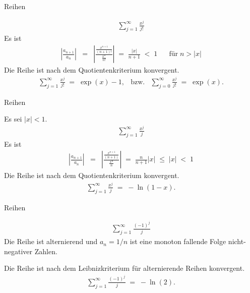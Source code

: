 \documentclass[german]{beamer}
\newcommand{\bq}{\begin{eqnarray*}}
\newcommand{\eq}{\end{eqnarray*}}
\begin{document}
\begin{frame}{Reihen}

\begin{example}
\bq
 \sum\limits_{j=1}^\infty \frac{x^j}{j!}
\eq
Es ist
\bq
 \left| \frac{a_{n+1}}{a_n} \right|
 & = & 
 \left| \frac{\frac{x^{n+1}}{(n+1)!}}{\frac{x^n}{n!}} \right|
 \; = \;
 \frac{\left|x\right|}{n+1} 
 \; < \; 1
 \;\;\;\;\;\; \mbox{f\"ur} \; n > |x|
\eq
Die Reihe ist nach dem Quotientenkriterium konvergent.
\bq
 \sum\limits_{j=1}^\infty \frac{x^j}{j!}
 \; = \; \exp\left(x\right) - 1,
 & \mbox{bzw.} &
 \sum\limits_{j=0}^\infty \frac{x^j}{j!}
 \; = \;\exp\left(x\right).
\eq

\end{example}

\end{frame}

\begin{frame}{Reihen}

\begin{example}
Es sei $|x|<1$.
\bq
 \sum\limits_{j=1}^\infty \frac{x^j}{j}
\eq
Es ist
\bq
 \left| \frac{a_{n+1}}{a_n} \right|
 & = & 
 \left| \frac{\frac{x^{n+1}}{(n+1)}}{\frac{x^n}{n}} \right|
 \; = \;
 \frac{n}{n+1} \left|x\right|
 \; \le \;  \left|x\right|
 \; < \; 1
\eq
Die Reihe ist nach dem Quotientenkriterium konvergent.
\bq
 \sum\limits_{j=1}^\infty \frac{x^j}{j}
 \; = \; -\ln\left(1-x\right).
\eq
\end{example}

\end{frame}

\begin{frame}{Reihen}

\begin{example}
\bq
 \sum\limits_{j=1}^\infty \frac{\left(-1\right)^j}{j}
\eq
Die Reihe ist alternierend und $a_n=1/n$ ist eine monoton fallende Folge nicht-negativer Zahlen.

Die Reihe ist nach dem Leibnizkriterium f\"ur alternierende Reihen konvergent.
\bq
 \sum\limits_{j=1}^\infty \frac{\left(-1\right)^j}{j}
 \; = \; -\ln\left(2\right).
\eq
\end{example}

\end{frame}
\end{document}

